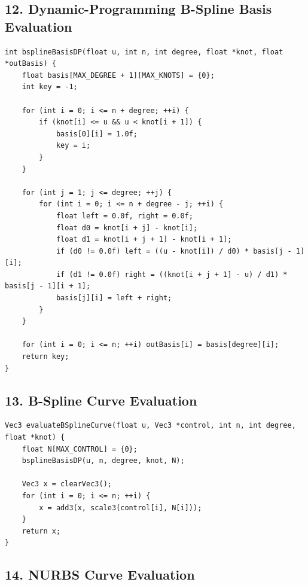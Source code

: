 \documentclass[10pt,letterpaper]{article}
\begin{document}
\subsection*{12. Dynamic-Programming B-Spline Basis Evaluation}

\begin{verbatim}
int bsplineBasisDP(float u, int n, int degree, float *knot, float *outBasis) {
    float basis[MAX_DEGREE + 1][MAX_KNOTS] = {0};
    int key = -1;

    for (int i = 0; i <= n + degree; ++i) {
        if (knot[i] <= u && u < knot[i + 1]) {
            basis[0][i] = 1.0f;
            key = i;
        }
    }

    for (int j = 1; j <= degree; ++j) {
        for (int i = 0; i <= n + degree - j; ++i) {
            float left = 0.0f, right = 0.0f;
            float d0 = knot[i + j] - knot[i];
            float d1 = knot[i + j + 1] - knot[i + 1];
            if (d0 != 0.0f) left = ((u - knot[i]) / d0) * basis[j - 1][i];
            if (d1 != 0.0f) right = ((knot[i + j + 1] - u) / d1) * basis[j - 1][i + 1];
            basis[j][i] = left + right;
        }
    }

    for (int i = 0; i <= n; ++i) outBasis[i] = basis[degree][i];
    return key;
}
\end{verbatim}

\subsection*{13. B-Spline Curve Evaluation}

\begin{verbatim}
Vec3 evaluateBSplineCurve(float u, Vec3 *control, int n, int degree, float *knot) {
    float N[MAX_CONTROL] = {0};
    bsplineBasisDP(u, n, degree, knot, N);

    Vec3 x = clearVec3();
    for (int i = 0; i <= n; ++i) {
        x = add3(x, scale3(control[i], N[i]));
    }
    return x;
}
\end{verbatim}

\subsection*{14. NURBS Curve Evaluation}
\end{document}
